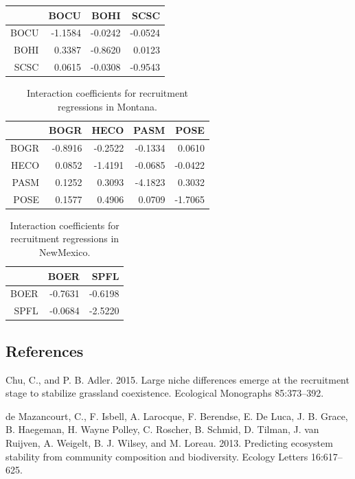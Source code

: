 \documentclass[12pt,]{article}
\begin{document}
\begin{table}[ht]
\begin{tabular}{rrrr}
  \hline
 & BOCU & BOHI & SCSC \\ 
  \hline
BOCU & -1.1584 & -0.0242 & -0.0524 \\ 
  BOHI & 0.3387 & -0.8620 & 0.0123 \\ 
  SCSC & 0.0615 & -0.0308 & -0.9543 \\ 
   \hline
\end{tabular}
\end{table}\begin{table}[ht]
\centering
\caption{Interaction coefficients for recruitment regressions in Montana.} 
\begin{tabular}{rrrrr}
  \hline
 & BOGR & HECO & PASM & POSE \\ 
  \hline
BOGR & -0.8916 & -0.2522 & -0.1334 & 0.0610 \\ 
  HECO & 0.0852 & -1.4191 & -0.0685 & -0.0422 \\ 
  PASM & 0.1252 & 0.3093 & -4.1823 & 0.3032 \\ 
  POSE & 0.1577 & 0.4906 & 0.0709 & -1.7065 \\ 
   \hline
\end{tabular}
\end{table}\begin{table}[ht]
\centering
\caption{Interaction coefficients for recruitment regressions in NewMexico.} 
\begin{tabular}{rrr}
  \hline
 & BOER & SPFL \\ 
  \hline
BOER & -0.7631 & -0.6198 \\ 
  SPFL & -0.0684 & -2.5220 \\ 
   \hline
\end{tabular}
\end{table}

\newpage{}

\subsection*{References}\label{references}

Chu, C., and P. B. Adler. 2015. Large niche differences emerge at the
recruitment stage to stabilize grassland coexistence. Ecological
Monographs 85:373--392.

{{de Mazancourt}}, C., F. Isbell, A. Larocque, F. Berendse, E. {De
Luca}, J. B. Grace, B. Haegeman, H. {Wayne Polley}, C. Roscher, B.
Schmid, D. Tilman, J. van Ruijven, A. Weigelt, B. J. Wilsey, and M.
Loreau. 2013. Predicting ecosystem stability from community composition
and biodiversity. Ecology Letters 16:617--625.
\end{document}
